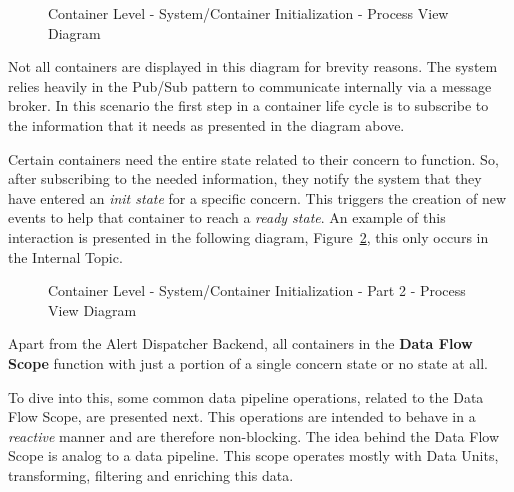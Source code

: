 \begin{figure}[H]
   \centering
   \resizebox{\columnwidth}{!}
   {
      
   }
   \caption[Container Level - System/Container Initialization - Process View Diagram]{Container Level - System/Container Initialization - Process View Diagram}
   \label{fig:design:architecture:platform:container:process:diagram:init}
\end{figure}

Not all containers are displayed in this diagram for brevity reasons.
The system relies heavily in the Pub/Sub \parencite{pubsub} pattern to communicate internally via a message broker. In this scenario the first step in a container life cycle is to subscribe to the information that it needs as presented in the diagram above.

Certain containers need the entire state related to their concern to function. So, after subscribing to the needed information, they notify the system that they have entered an \textit{init state} for a specific concern. This triggers the creation of new events to help that container to reach a \textit{ready state}. An example of this interaction is presented in the following diagram, Figure~\ref{fig:design:architecture:platform:container:process:diagram:ready}, this only occurs in the Internal Topic.

\begin{figure}[H]
   \centering
   \resizebox{\columnwidth}{!}
   {
      
   }
   \caption[Container Level - System/Container Initialization - Part 2 - Process View Diagram]{Container Level - System/Container Initialization - Part 2 - Process View Diagram}
   \label{fig:design:architecture:platform:container:process:diagram:ready}
\end{figure}

Apart from the Alert Dispatcher Backend, all containers in the \textbf{Data Flow Scope} function with just a portion of a single concern state or no state at all.

To dive into this, some common data pipeline operations, related to the Data Flow Scope, are presented next. This operations are intended to behave in a \textit{reactive} manner \parencite{reactivemanifesto} and are therefore non-blocking. The idea behind the Data Flow Scope is analog to a data pipeline. This scope operates mostly with Data Units, transforming, filtering and enriching this data.

